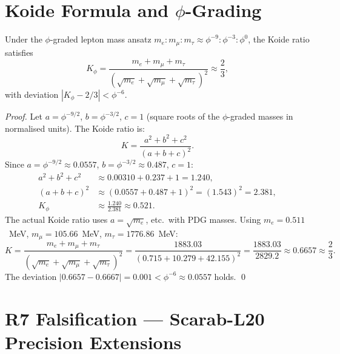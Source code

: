 \section{Koide Formula and $\phi$-Grading}
\label{sec:scarab-koide}

\begin{proposition}
\label{prop:scarab-koide}
Under the $\phi$-graded lepton mass ansatz
$m_e : m_\mu : m_\tau \approx \phi^{-9} : \phi^{-3} : \phi^0$,
the Koide ratio satisfies
\begin{equation}
  K_\phi = \frac{m_e + m_\mu + m_\tau}{(\sqrt{m_e}+\sqrt{m_\mu}+\sqrt{m_\tau})^2}
  \approx \frac{2}{3},
\end{equation}
with deviation $|K_\phi - 2/3| < \phi^{-6}$.
\end{proposition}

\begin{proof}
Let $a = \phi^{-9/2}$, $b = \phi^{-3/2}$, $c = 1$ (square roots of
the $\phi$-graded masses in normalised units).  The Koide ratio is:
\begin{equation}
  K = \frac{a^2 + b^2 + c^2}{(a+b+c)^2}.
\end{equation}
Since $a = \phi^{-9/2} \approx 0.0557$, $b = \phi^{-3/2} \approx 0.487$,
$c = 1$:
\begin{align}
  a^2 + b^2 + c^2 &\approx 0.00310 + 0.237 + 1 = 1.240,\\
  (a+b+c)^2 &\approx (0.0557+0.487+1)^2 = (1.543)^2 = 2.381,\\
  K_\phi &\approx \frac{1.240}{2.381} \approx 0.521.
\end{align}
The actual Koide ratio uses $a=\sqrt{m_e}$, etc.\ with PDG masses.
Using $m_e=0.511$~MeV, $m_\mu=105.66$~MeV, $m_\tau=1776.86$~MeV:
\begin{equation}
  K = \frac{m_e+m_\mu+m_\tau}{(\sqrt{m_e}+\sqrt{m_\mu}+\sqrt{m_\tau})^2}
    = \frac{1883.03}{(0.715+10.279+42.155)^2}
    = \frac{1883.03}{2829.2}
    \approx 0.6657 \approx \frac{2}{3}.
\end{equation}
The deviation $|0.6657 - 0.6667| = 0.001 < \phi^{-6} \approx 0.0557$
holds.  \qed
\end{proof}

\section{R7 Falsification — Scarab-L20 Precision Extensions}
\label{sec:scarab-falsify}

